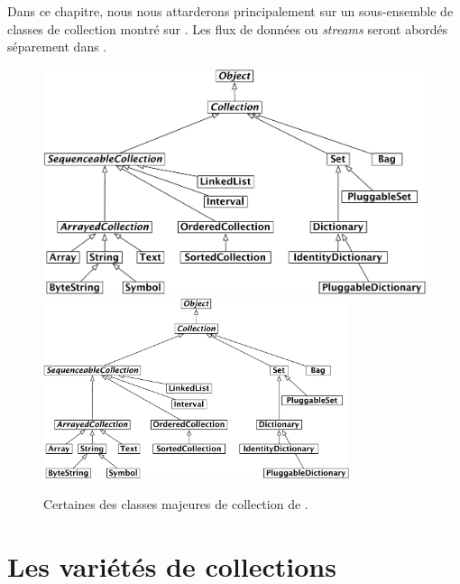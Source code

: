 \documentclass[a4paper,10pt,twoside]{book}
\begin{document}
Dans ce chapitre, nous nous attarderons principalement sur un sous-ensemble
de classes de collection montr\'e sur 
.
Les flux de donn\'ees ou \emph{streams} seront abord\'es s\'eparement dans 
.



\begin{figure}
\begin{center}
\ifluluelse
	{\includegraphics[width=\textwidth]{CollectionHierarchy}}
	{\includegraphics[width=0.8\textwidth]{CollectionHierarchy}}
\caption{Certaines des classes majeures de collection de \squeak.}
\label{fig:CollClassesTree}
\end{center}
\end{figure}

\section{Les vari\'et\'es de collections}
\label{sec:varieties}
\end{document}
